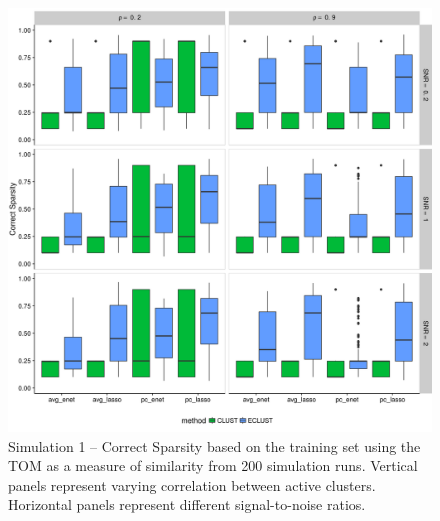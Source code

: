 \begin{appendices}
\begin{figure}[H]
	\centering
	\includegraphics[scale=0.6, keepaspectratio]{./figs/hydra/results/figures/sim1-sept10/CorrectSparsity_TOM_sim1.png}
	\caption{Simulation 1 -- Correct Sparsity based on the training set using the TOM as a measure of similarity from 200 simulation runs. Vertical panels represent varying correlation between active clusters. Horizontal panels represent different signal-to-noise ratios.}
	\label{fig:CorrectSparsity_TOM_sim1}
\end{figure}



\end{appendices}

